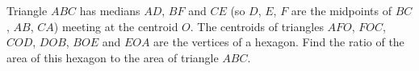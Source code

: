 Triangle $ABC$ has medians $AD$, $BF$ and $CE$ (so $D$, $E$, $F$ are the midpoints of $BC$, $AB$, $CA$) meeting at the centroid $O$. The centroids of triangles $AFO$, $FOC$, $COD$, $DOB$, $BOE$ and $EOA$ are the vertices of a hexagon. Find the ratio of the area of this hexagon to the area of triangle $ABC$.
